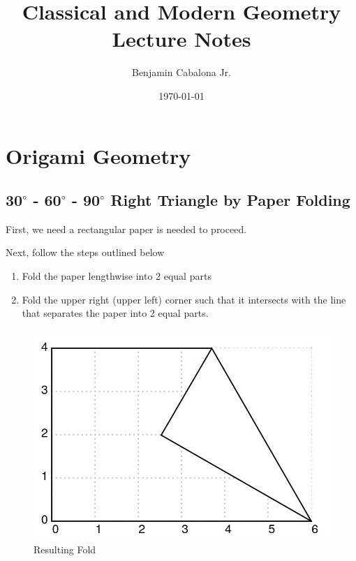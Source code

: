 \documentclass{article}
\title{Classical and Modern Geometry Lecture Notes}
\author{Benjamin Cabalona Jr.}
\date{\today}
\begin{document}
    \maketitle
    
    \tableofcontents
    
    \newpage
    
    \section{Origami Geometry}

        \subsection{30$^{\circ}$ - 60$^{\circ}$ - 90$^{\circ}$  Right Triangle by Paper Folding}
        
        First, we need a rectangular paper is needed to proceed.


        Next, follow the steps outlined below
        \begin{enumerate}
            \item Fold the paper lengthwise into 2 equal parts
            \item Fold the upper right (upper left) corner such that it intersects 
            with the line that separates the paper into 2 equal parts.
        \end{enumerate}

        \begin{figure}[h!]
            \centering
            \includegraphics[width=1\textwidth]{306090.png}
            \caption{Resulting Fold}
        \end{figure}
\end{document}

